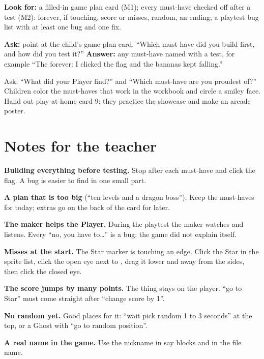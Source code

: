 \begin{formativecheck}
\textbf{Look for:} a filled-in game plan card (M1); every must-have checked off after a test (M2): forever, if touching, score or misses, random, an ending; a playtest bug list with at least one bug and one fix.

\textbf{Ask:} point at the child's game plan card. \enquote{Which must-have did you build first, and how did you test it?}
\textbf{Answer:} any must-have named with a test, for example \enquote{The forever: I clicked the flag and the bananas kept falling.}
\end{formativecheck}

\begin{reflection}
Ask: \enquote{What did your Player find?} and \enquote{Which must-have are you proudest of?} Children color the must-haves that work in the workbook and circle a smiley face. Hand out play-at-home card 9: they practice the showcase and make an arcade poster.
\end{reflection}

\section{Notes for the teacher}
\begin{commonmistakes}
  \item \textbf{Building everything before testing.} Stop after each must-have and click the flag. A bug is easier to find in one small part.
  \item \textbf{A plan that is too big} (\enquote{ten levels and a dragon boss}). Keep the must-haves for today; extras go on the back of the card for later.
  \item \textbf{The maker helps the Player.} During the playtest the maker watches and listens. Every \enquote{no, you have to\ldots} is a bug: the game did not explain itself.
  \item \textbf{Misses at the start.} The Star marker is touching an edge. Click the Star in the sprite list, click the open eye next to , drag it lower and away from the sides, then click the closed eye.
  \item \textbf{The score jumps by many points.} The thing stays on the player. \enquote{go to Star} must come straight after \enquote{change score by 1}.
  \item \textbf{No random yet.} Good places for it: \enquote{wait pick random 1 to 3 seconds} at the top, or a Ghost with \enquote{go to random position}.
  \item \textbf{A real name in the game.} Use the nickname in say blocks and in the file name.
\end{commonmistakes}

